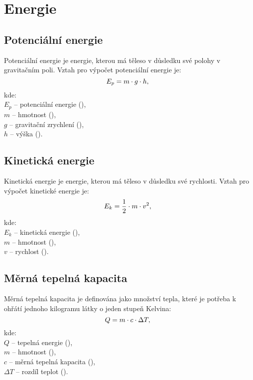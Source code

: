 \documentclass{article}
\begin{document}
\newpage



\section{Energie}


\subsection{Potenciální energie}
Potenciální energie je energie, kterou má těleso v důsledku své polohy v gravitačním poli. Vztah pro výpočet potenciální energie je:
\begin{equation}
    E_p = m \cdot g \cdot h,
    \tagaddtext{(\ueqJ)}
\end{equation}
kde:\\
$E_p$ -- potenciální energie (\ueqJ),\\
$m$ -- hmotnost (\ueqKG),\\
$g$ -- gravitační zrychlení (\ueqMandSinvsq),\\
$h$ -- výška (\ueqM).


\subsection{Kinetická energie}
Kinetická energie je energie, kterou má těleso v důsledku své rychlosti. Vztah pro výpočet kinetické energie je:
\begin{equation}
    E_k = \frac{1}{2} \cdot m \cdot v^2,
    \tagaddtext{(\ueqJ)}
\end{equation}
kde:\\
$E_k$ -- kinetická energie (\ueqJ),\\
$m$ -- hmotnost (\ueqKG),\\
$v$ -- rychlost (\ueqMandSinv).


\subsection{Měrná tepelná kapacita}
Měrná tepelná kapacita je definována jako množství tepla, které je potřeba k ohřátí jednoho kilogramu látky o jeden stupeň Kelvina:
\begin{equation}
    Q = m \cdot c \cdot \Delta T,
    \tagaddtext{(\ueqJ)}
\end{equation}
kde:\\
$Q$ -- tepelná energie (\ueqJ),\\
$m$ -- hmotnost (\ueqKG),\\
$c$ -- měrná tepelná kapacita (\ueqJandKGinvKinv),\\
$\Delta T$ -- rozdíl teplot (\ueqK).
\end{document}
